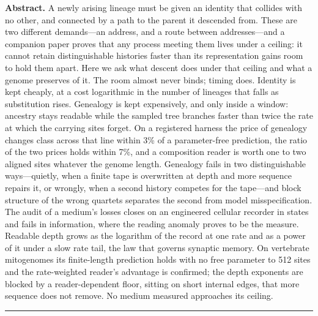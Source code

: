 \documentclass[11pt]{article}
\begin{document}
\vspace{6pt}
\noindent\textbf{Abstract.}
A newly arising lineage must be given an identity that collides with no other, and connected by a path to the parent it descended from. These are two different demands---an address, and a route between addresses---and a companion paper proves that any process meeting them lives under a ceiling: it cannot retain distinguishable histories faster than its representation gains room to hold them apart. Here we ask what descent does under that ceiling and what a genome preserves of it. The room almost never binds; timing does. Identity is kept cheaply, at a cost logarithmic in the number of lineages that falls as substitution rises. Genealogy is kept expensively, and only inside a window: ancestry stays readable while the sampled tree branches faster than twice the rate at which the carrying sites forget. On a registered harness the price of genealogy changes class across that line within 3\% of a parameter-free prediction, the ratio of the two prices holds within 7\%, and a composition reader is worth one to two aligned sites whatever the genome length. Genealogy fails in two distinguishable ways---quietly, when a finite tape is overwritten at depth and more sequence repairs it, or wrongly, when a second history competes for the tape---and block structure of the wrong quartets separates the second from model misspecification. The audit of a medium's losses closes on an engineered cellular recorder in states and fails in information, where the reading anomaly proves to be the measure. Readable depth grows as the logarithm of the record at one rate and as a power of it under a slow rate tail, the law that governs synaptic memory. On vertebrate mitogenomes its finite-length prediction holds with no free parameter to 512 sites and the rate-weighted reader's advantage is confirmed; the depth exponents are blocked by a reader-dependent floor, sitting on short internal edges, that more sequence does not remove. No medium measured approaches its ceiling.

\vspace{4pt}

\vspace{8pt}\noindent\rule{\textwidth}{0.4pt}
\bigskip

\end{document}

